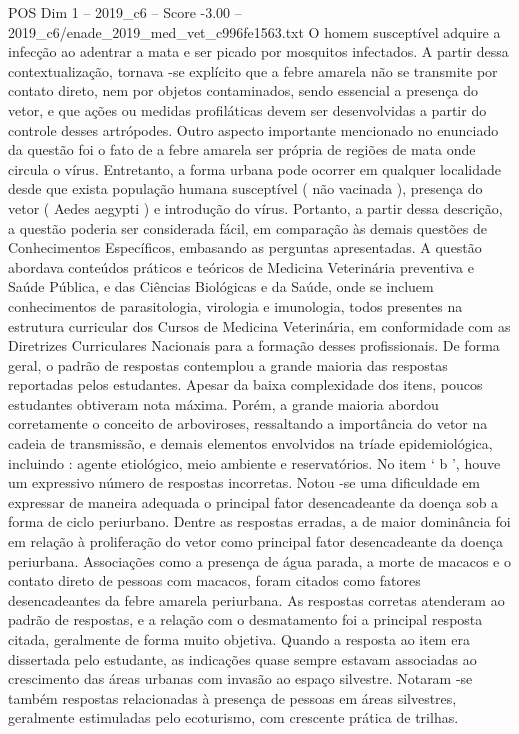 \begin{textsample}{POS Dim 1 – 2019\_c6 – Score -3.00 – 2019\_c6/enade\_2019\_med\_vet\_c996fe1563.txt}
O homem susceptível adquire a infecção ao adentrar a mata e ser picado por mosquitos infectados.
A partir dessa contextualização, tornava -se explícito que a febre amarela não se transmite por contato direto, nem por objetos contaminados, sendo essencial a presença do vetor, e que ações ou medidas profiláticas devem ser desenvolvidas a partir do controle desses artrópodes.
Outro aspecto importante mencionado no enunciado da questão foi o fato de a febre amarela ser própria de regiões de mata onde circula o vírus.
Entretanto, a forma urbana pode ocorrer em qualquer localidade desde que exista população humana susceptível ( não vacinada ), presença do vetor ( Aedes aegypti ) e introdução do vírus.
Portanto, a partir dessa descrição, a questão poderia ser considerada fácil, em comparação às demais questões de Conhecimentos Específicos, embasando as perguntas apresentadas.
A questão abordava conteúdos práticos e teóricos de Medicina Veterinária preventiva e Saúde Pública, e das Ciências Biológicas e da Saúde, onde se incluem conhecimentos de parasitologia, virologia e imunologia, todos presentes na estrutura curricular dos Cursos de Medicina Veterinária, em conformidade com as Diretrizes Curriculares Nacionais para a formação desses profissionais.
De forma geral, o padrão de respostas contemplou a grande maioria das respostas reportadas pelos estudantes.
Apesar da baixa complexidade dos itens, poucos estudantes obtiveram nota máxima.
Porém, a grande maioria abordou corretamente o conceito de arboviroses, ressaltando a importância do vetor na cadeia de transmissão, e demais elementos envolvidos na tríade epidemiológica, incluindo : agente etiológico, meio ambiente e reservatórios.
No item ‘ b ’, houve um expressivo número de respostas incorretas.
Notou -se uma dificuldade em expressar de maneira adequada o principal fator desencadeante da doença sob a forma de ciclo periurbano.
Dentre as respostas erradas, a de maior dominância foi em relação à proliferação do vetor como principal fator desencadeante da doença periurbana.
Associações como a presença de água parada, a morte de macacos e o contato direto de pessoas com macacos, foram citados como fatores desencadeantes da febre amarela periurbana.
As respostas corretas atenderam ao padrão de respostas, e a relação com o desmatamento foi a principal resposta citada, geralmente de forma muito objetiva.
Quando a resposta ao item era dissertada pelo estudante, as indicações quase sempre estavam associadas ao crescimento das áreas urbanas com invasão ao espaço silvestre.
Notaram -se também respostas relacionadas à presença de pessoas em áreas silvestres, geralmente estimuladas pelo ecoturismo, com crescente prática de trilhas.

\end{textsample}
